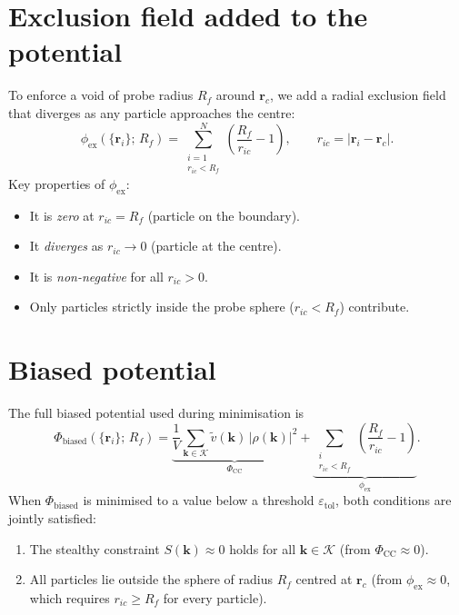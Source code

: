 \documentclass[11pt]{article}
\begin{document}
\section{Exclusion field added to the potential}

To enforce a void of probe radius $R_f$ around $\mathbf{r}_c$, we add a
radial exclusion field that diverges as any particle approaches the
centre:
\begin{equation}
    \phi_{\mathrm{ex}}(\{\mathbf{r}_i\};\,R_f)
    = \sum_{\substack{i=1\\r_{ic}<R_f}}^{N}
      \left(\frac{R_f}{r_{ic}} - 1\right),
    \qquad
    r_{ic} = |\mathbf{r}_i - \mathbf{r}_c|.
    \label{eq:phiex}
\end{equation}
Key properties of $\phi_{\mathrm{ex}}$:
\begin{itemize}
    \item It is \emph{zero} at $r_{ic}=R_f$ (particle on the boundary).
    \item It \emph{diverges} as $r_{ic}\to 0$ (particle at the centre).
    \item It is \emph{non-negative} for all $r_{ic}>0$.
    \item Only particles strictly inside the probe sphere ($r_{ic}<R_f$)
          contribute.
\end{itemize}

\section{Biased potential}

The full biased potential used during minimisation is
\begin{equation}
    \boxed{
    \Phi_{\mathrm{biased}}(\{\mathbf{r}_i\};\,R_f)
    = \underbrace{\frac{1}{V}
      \sum_{\mathbf{k}\in\mathcal{K}}
      \tilde{v}(\mathbf{k})\,|\rho(\mathbf{k})|^{2}}_{\Phi_{\mathrm{CC}}}
    +
    \underbrace{\sum_{\substack{i\\r_{ic}<R_f}}
      \!\!\left(\frac{R_f}{r_{ic}}-1\right)}_{\phi_{\mathrm{ex}}}.
    }
    \label{eq:biased}
\end{equation}
When $\Phi_{\mathrm{biased}}$ is minimised to a value below a threshold
$\varepsilon_{\mathrm{tol}}$, both conditions are jointly satisfied:
\begin{enumerate}
    \item The stealthy constraint $S(\mathbf{k})\approx 0$ holds for all
          $\mathbf{k}\in\mathcal{K}$ (from $\Phi_{\mathrm{CC}}\approx 0$).
    \item All particles lie outside the sphere of radius $R_f$ centred at
          $\mathbf{r}_c$ (from $\phi_{\mathrm{ex}}\approx 0$, which
          requires $r_{ic}\ge R_f$ for every particle).
\end{enumerate}
\end{document}
